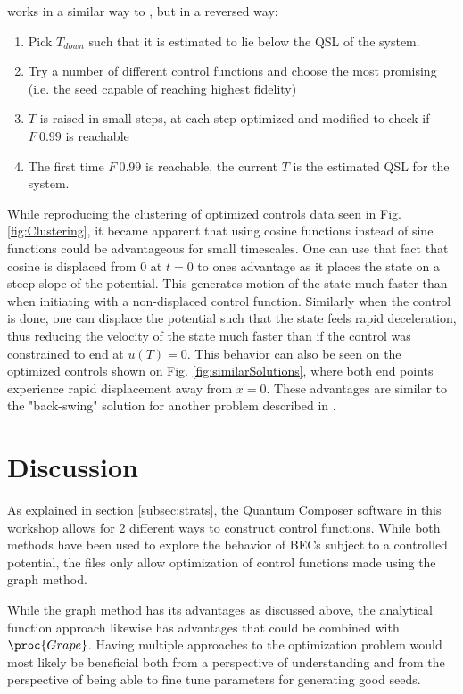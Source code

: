 \documentclass[aps,pra,reprint,superscriptaddress]{revtex4-1}
\begin{document}
 works in a similar way to , but in a reversed way: 
\begin{enumerate}
	\item Pick $T_{down}$ such that it is estimated to lie below the QSL of the system.
	\item Try a number of different control functions and choose the most promising (i.e. the seed capable of reaching highest fidelity)
	\item $T$ is raised in small steps, at each step optimized and modified to check if $F~0.99$ is reachable
	\item The first time $F~0.99$ is reachable, the current $T$ is the estimated QSL for the system.
\end{enumerate}

While reproducing the clustering of optimized controls data seen in Fig. \ref{fig:Clustering}, it became apparent that using cosine functions instead of sine functions could be advantageous for small timescales. One can use that fact that cosine is displaced from 0 at $t=0$ to ones advantage as it places the state on a steep slope of the potential. This generates motion of the state much faster than when initiating with a non-displaced control function. Similarly when the control is done, one can displace the potential such that the state feels rapid deceleration, thus reducing the velocity of the state much faster than if the control was constrained to end at $u(T)=0$. This behavior can also be seen on the optimized controls shown on Fig. \ref{fig:similarSolutions}, where both end points experience rapid displacement away from $x=0$. These advantages are similar to the "back-swing" solution for another problem described in \cite{QM2Paper}.
\section{\label{sec:disc}Discussion}
As explained in section \ref{subsec:strats}, the Quantum Composer software in this workshop allows for 2 different ways to construct control functions. While both methods have been used to explore the behavior of BECs subject to a controlled potential, the files only allow optimization of control functions made using the graph method. 

While the graph method has its advantages as discussed above, the analytical function approach likewise has advantages that could be combined with $\proc{Grape}$. Having multiple approaches to the optimization problem would most likely be beneficial both from a perspective of understanding and from the perspective of being able to fine tune parameters for generating good seeds.\\
\end{document}
